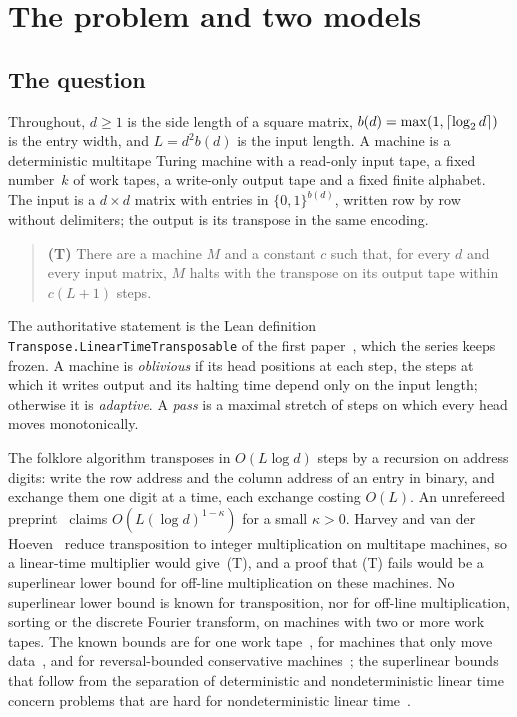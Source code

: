\section{The problem and two models}\label{sec:prelim}

\subsection{The question}\label{sec:question}

Throughout, $d\ge1$ is the side length of a square matrix, $b(d)=\max(1,\lceil \log_2 d \rceil)$ is the entry width, and $L=d^2b(d)$ is
the input length. A machine is a deterministic multitape Turing machine with a read-only input tape, a fixed number~$k$ of
work tapes, a write-only output tape and a fixed finite alphabet. The input is a $d\times d$ matrix with entries in
$\{0,1\}^{b(d)}$, written row by row without delimiters; the output is its transpose in the same encoding.

\begin{quote}
\textbf{(T)} There are a machine $M$ and a constant $c$ such that, for every $d$ and every input matrix, $M$ halts with
the transpose on its output tape within $c(L+1)$ steps.
\end{quote}

The authoritative statement is the Lean definition \texttt{Transpose.LinearTimeTransposable} of the first
paper~\cite{FirstPaper2026}, which the series keeps frozen. A machine is \emph{oblivious} if its head positions at each
step, the steps at which it writes output and its halting time depend only on the input length; otherwise it is
\emph{adaptive}. A \emph{pass} is a maximal stretch of steps on
which every head moves monotonically.

The folklore algorithm transposes in $O(L\log d)$ steps by a recursion on address digits: write the row address and the
column address of an entry in binary, and exchange them one digit at a time, each exchange costing $O(L)$. An unrefereed
preprint~\cite{OpenAI2026mult} claims $O(L(\log d)^{1-\kappa})$ for a small $\kappa>0$. Harvey and van der
Hoeven~\cite{HvdH2025} reduce transposition to integer multiplication on multitape machines, so a linear-time multiplier
would give~(T), and a proof that (T) fails would be a superlinear lower bound for off-line multiplication on these
machines. No superlinear lower bound is known for transposition, nor for off-line multiplication, sorting or the
discrete Fourier transform, on machines with two or more work tapes. The known bounds are for one work
tape~\cite{DMS1991,DietzfelbingerMaass1993}, for machines that only move data~\cite{Stoss1973}, and for
reversal-bounded conservative machines~\cite{Kirchherr1988}; the superlinear bounds that follow from the separation of
deterministic and nondeterministic linear time~\cite{PPST1983} concern problems that are hard for nondeterministic
linear time~\cite{Grandjean1988}.

